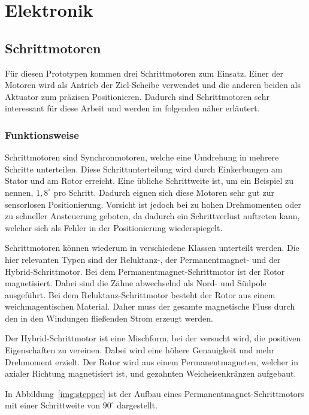 \chapter{Elektronik}
\label{chap:elektronik}

\section{Schrittmotoren}
Für diesen Prototypen kommen drei Schrittmotoren zum Einsatz.
Einer der Motoren wird als Antrieb der Ziel-Scheibe verwendet und die anderen beiden als Aktuator zum präzisen Positionieren.
Dadurch sind Schrittmotoren sehr interessant für diese Arbeit und werden im folgenden näher erläutert.


\subsection{Funktionsweise}
Schrittmotoren sind Synchronmotoren, welche eine Umdrehung in mehrere Schritte unterteilen.
Diese Schrittunterteilung wird durch Einkerbungen am Stator und am Rotor erreicht.
Eine übliche Schrittweite ist, um ein Beispiel zu nennen, $1,8^\circ$ pro Schritt.
Dadurch eignen sich diese Motoren sehr gut zur sensorlosen Positionierung.
Vorsicht ist jedoch bei zu hohen Drehmomenten oder zu schneller Ansteuerung geboten, da dadurch ein Schrittverlust auftreten kann, welcher sich als Fehler in der Positionierung wiederspiegelt.

Schrittmotoren können wiederum in verschiedene Klassen unterteilt werden.
Die hier relevanten Typen sind der Reluktanz-, der Permanentmagnet- und der Hybrid-Schrittmotor.
Bei dem Permanentmagnet-Schrittmotor ist der Rotor magnetisiert.
Dabei sind die Zähne abwechselnd als Nord- und Südpole ausgeführt.
Bei dem Reluktanz-Schrittmotor besteht der Rotor aus einem weichmagentischen Material.
Daher muss der gesamte magnetische Fluss durch den in den Windungen fließenden Strom erzeugt werden.

Der Hybrid-Schrittmotor ist eine Mischform, bei der versucht wird, die positiven Eigenschaften zu vereinen.
Dabei wird eine höhere Genauigkeit und mehr Drehmoment erzielt. 
Der Rotor wird aus einem Permanentmagneten, welcher in axialer Richtung magnetisiert ist, und gezahnten Weicheisenkränzen aufgebaut. \cite[28]{book:werkzeugmaschinen}

In Abbildung~\ref{img:stepper} ist der Aufbau eines Permanentmagnet-Schrittmotors mit einer Schrittweite von $90^\circ$ dargestellt.

